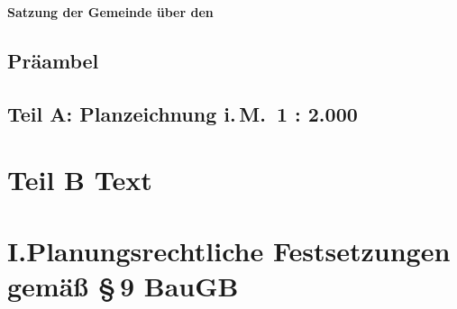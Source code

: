\documentclass{bplan-festsetzungen}
\begin{document}
\textbf{Satzung der Gemeinde \Gemeinde{} über den \BPlan{}}
\bigskip

\subsection*{Präambel}


\bigskip

\subsection*{Teil A: Planzeichnung i.\,M.~1 : 2.000}


\bigskip

\section*{Teil B Text}

\section*{I.\hspace{17pt}Planungsrechtliche Festsetzungen gemäß §\,9 BauGB}
\end{document}
